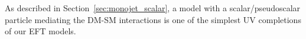 As described in Section~\ref{sec:monojet_scalar}, a model with a scalar/pseudoscalar particle mediating the DM-SM interactions is one of the simplest UV completions of our EFT models. 




